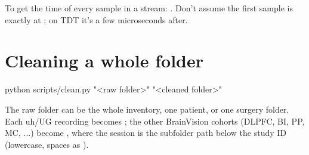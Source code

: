 \medskip
To get the time of every sample in a stream: . Don't assume the first sample is exactly at ; on TDT it's a few microseconds after.

\section{Cleaning a whole folder}

\begin{codebox}
python scripts/clean.py "<raw folder>" "<cleaned folder>"
\end{codebox}
The raw folder can be the whole inventory, one patient, or one surgery folder. Each uh/UG recording becomes
; the other BrainVision cohorts (DLPFC, BI, PP, MC, ...) become
, where the session is the subfolder path below the study ID (lowercase, spaces as \code{_}).

